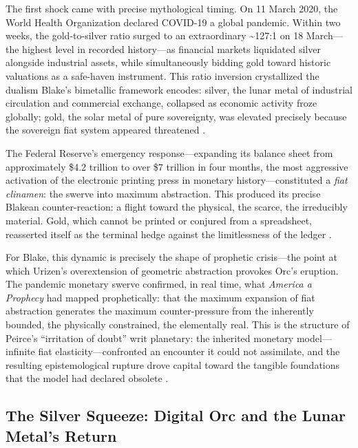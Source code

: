 \documentclass[
]{article}
\begin{document}
The first shock came with precise mythological timing. On 11 March 2020,
the World Health Organization declared COVID-19 a global pandemic.
Within two weeks, the gold-to-silver ratio surged to an extraordinary
\textasciitilde127:1 on 18 March---the highest level in recorded
history---as financial markets liquidated silver alongside industrial
assets, while simultaneously bidding gold toward historic valuations as
a safe-haven instrument. This ratio inversion crystallized the dualism
Blake's bimetallic framework encodes: silver, the lunar metal of
industrial circulation and commercial exchange, collapsed as economic
activity froze globally; gold, the solar metal of pure sovereignty, was
elevated precisely because the sovereign fiat system appeared threatened
\citep{silverinstitute2021world}.

The Federal Reserve's emergency response---expanding its balance sheet
from approximately \$4.2 trillion to over \$7 trillion in four months,
the most aggressive activation of the electronic printing press in
monetary history---constituted a \emph{fiat clinamen}: the swerve into
maximum abstraction. This produced its precise Blakean counter-reaction:
a flight toward the physical, the scarce, the irreducibly material.
Gold, which cannot be printed or conjured from a spreadsheet, reasserted
itself as the terminal hedge against the limitlessness of the ledger
\citep{steil2013battle}.

For Blake, this dynamic is precisely the shape of prophetic crisis---the
point at which Urizen's overextension of geometric abstraction provokes
Orc's eruption. The pandemic monetary swerve confirmed, in real time,
what \emph{America a Prophecy} had mapped prophetically: that the
maximum expansion of fiat abstraction generates the maximum
counter-pressure from the inherently bounded, the physically
constrained, the elementally real. This is the structure of Peirce's
``irritation of doubt'' writ planetary: the inherited monetary
model---infinite fiat elasticity---confronted an encounter it could not
assimilate, and the resulting epistemological rupture drove capital
toward the tangible foundations that the model had declared obsolete
\citep{friedman2026blake, friedman2026doors}.

\subsection{The Silver Squeeze: Digital Orc and the Lunar Metal's
Return}\label{the-silver-squeeze-digital-orc-and-the-lunar-metals-return}
\end{document}

